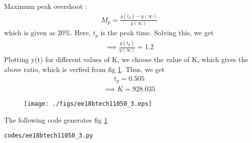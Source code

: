 \begin{enumerate}[label=\thesection.\arabic*.,ref=\thesection.\theenumi]
Maximum peak overshoot :
\begin{align}
    M_p = \frac{y(t_p) - y(\infty)}{y(\infty)}
    \label{eq:ee18btech11050_15}
\end{align}
which is given as 20\%.
Here, $t_p$ is the peak time. Solving this, we get
\begin{align}
    \implies \frac{y(t_p)}{y(\infty)} = 1.2
    \label{eq:ee18btech11050_18}
\end{align}
Plotting y(t) for different values of K, we choose the value of K, which gives the above ratio, which is verfied from fig \ref{fig:ee18btech11050_fig4}.
Thus, we get 
\begin{align}
    t_p = 0.505
    \label{eq:ee18btech11050_16}
\end{align}
\begin{align}
    \implies K = 928.035
    \label{eq:ee18btech11050_17}
\end{align}



\begin{figure}[!ht]
\centering
\texttt{[image: ./figs/ee18btech11050\_3.eps]}
\caption{}
\label{fig:ee18btech11050_fig4}
\end{figure}

The following code generates fig \ref{fig:ee18btech11050_fig4}
\begin{lstlisting}
codes/ee18btech11050_3.py
\end{lstlisting}

\end{enumerate}
